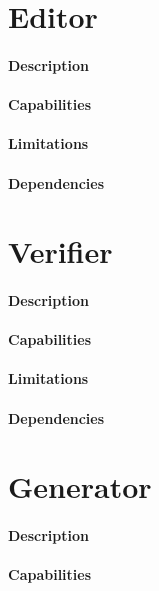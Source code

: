 \section{Editor} %
\label{sec:editor}

\paragraph{Description}
\paragraph{Capabilities}
\paragraph{Limitations}
\paragraph{Dependencies}

\section{Verifier} %
\label{sec:verifier}

\paragraph{Description}
\paragraph{Capabilities}
\paragraph{Limitations}
\paragraph{Dependencies}

\section{Generator} %
\label{sec:generator}

\paragraph{Description}
\paragraph{Capabilities}
